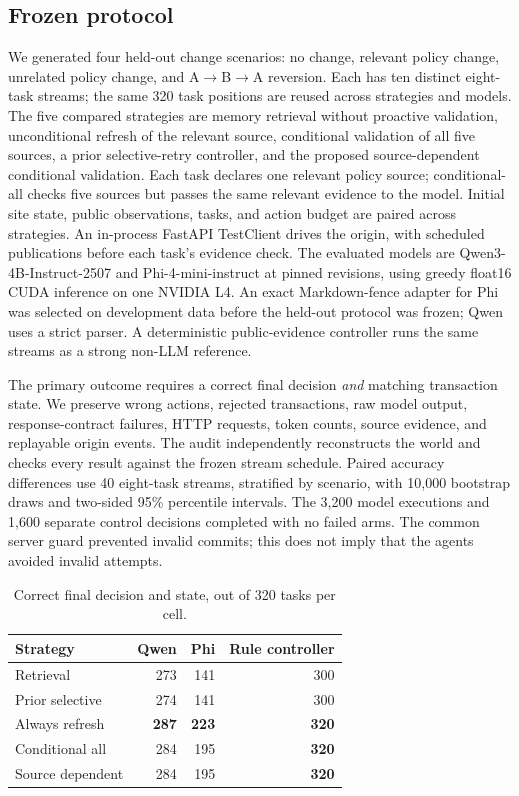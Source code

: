 \documentclass[sigconf,screen,review]{acmart}
\begin{document}
\subsection{Frozen protocol}
We generated four held-out change scenarios: no change, relevant policy
change, unrelated policy change, and A$\rightarrow$B$\rightarrow$A
reversion. Each has ten distinct eight-task streams; the same 320 task
positions are reused across strategies and models. The five compared
strategies are memory retrieval without proactive validation, unconditional
refresh of the relevant source, conditional validation of all five sources,
a prior selective-retry controller, and the proposed source-dependent
conditional validation. Each task declares one relevant policy source;
conditional-all checks five sources but passes the same relevant evidence to
the model. Initial site state, public observations, tasks, and action budget
are paired across strategies. An in-process FastAPI TestClient drives the
origin, with scheduled publications before each task's evidence check. The evaluated models are
Qwen3-4B-Instruct-2507 and Phi-4-mini-instruct at pinned revisions, using
greedy float16 CUDA inference on one NVIDIA L4. An exact Markdown-fence
adapter for Phi was selected on development data before the held-out protocol
was frozen; Qwen uses a strict parser. A deterministic public-evidence
controller runs the same streams as a strong non-LLM reference.

The primary outcome requires a correct final decision \emph{and} matching
transaction state. We preserve wrong actions, rejected transactions, raw
model output, response-contract failures, HTTP requests, token counts, source evidence,
and replayable origin events. The audit independently reconstructs the
world and checks every result against the frozen stream schedule. Paired
accuracy differences use 40 eight-task streams, stratified by scenario,
with 10,000 bootstrap draws and two-sided 95\% percentile intervals.
The 3,200 model executions and 1,600 separate control decisions completed
with no failed arms. The common server guard prevented invalid commits;
this does not imply that the agents avoided invalid attempts.

\begin{table}[t]
\caption{Correct final decision and state, out of 320 tasks per cell.}
\label{tab:results}
\small
\begin{tabular}{lrrr}
\toprule
Strategy & Qwen & Phi & Rule controller \\
\midrule
Retrieval & 273 & 141 & 300 \\
Prior selective & 274 & 141 & 300 \\
Always refresh & \textbf{287} & \textbf{223} & \textbf{320} \\
Conditional all & 284 & 195 & \textbf{320} \\
Source dependent & 284 & 195 & \textbf{320} \\
\bottomrule
\end{tabular}
\end{table}
\end{document}
